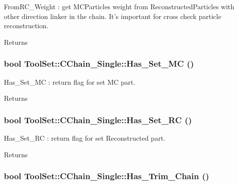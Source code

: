FromRC\_\-Weight : get MCParticles weight from ReconstructedParticles with other direction linker in the chain. It's important for cross check particle reconstruction.

\begin{DoxyReturn}{Returns}

\end{DoxyReturn}
\hypertarget{classToolSet_1_1CChain__Single_aa6b5eb85cc8d0505234cc6da2391fbbd}{
\subsubsection[{Has\_\-Set\_\-MC}]{\setlength{\rightskip}{0pt plus 5cm}bool ToolSet::CChain\_\-Single::Has\_\-Set\_\-MC ()}}
\label{classToolSet_1_1CChain__Single_aa6b5eb85cc8d0505234cc6da2391fbbd}


Has\_\-Set\_\-MC : return flag for set MC part. \begin{DoxyReturn}{Returns}

\end{DoxyReturn}
\hypertarget{classToolSet_1_1CChain__Single_ac908ef21df959857275fe1de00c76e2c}{
\subsubsection[{Has\_\-Set\_\-RC}]{\setlength{\rightskip}{0pt plus 5cm}bool ToolSet::CChain\_\-Single::Has\_\-Set\_\-RC ()}}
\label{classToolSet_1_1CChain__Single_ac908ef21df959857275fe1de00c76e2c}


Has\_\-Set\_\-RC : return flag for set Reconstructed part. \begin{DoxyReturn}{Returns}

\end{DoxyReturn}
\hypertarget{classToolSet_1_1CChain__Single_a237f2bcfb3006f37363ae6e4e39bbb44}{
\subsubsection[{Has\_\-Trim\_\-Chain}]{\setlength{\rightskip}{0pt plus 5cm}bool ToolSet::CChain\_\-Single::Has\_\-Trim\_\-Chain ()}}
\label{classToolSet_1_1CChain__Single_a237f2bcfb3006f37363ae6e4e39bbb44}


